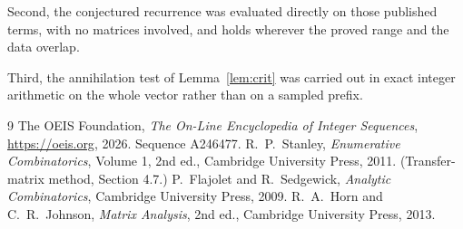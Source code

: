 \documentclass[11pt,a4paper]{article}
\theoremstyle{plain}
\theoremstyle{definition}
\begin{document}
Second, the conjectured recurrence was evaluated directly on those published terms, with no
matrices involved, and holds wherever the proved range and the data overlap.

Third, the annihilation test of Lemma~\ref{lem:crit} was carried out in exact integer
arithmetic on the whole vector rather than on a sampled prefix.

\begin{thebibliography}{9}
 The OEIS Foundation, \emph{The On-Line Encyclopedia of Integer
Sequences}, \url{https://oeis.org}, 2026. Sequence A246477.
 R.~P.~Stanley, \emph{Enumerative Combinatorics}, Volume 1, 2nd ed.,
Cambridge University Press, 2011. (Transfer-matrix method, Section 4.7.)
 P.~Flajolet and R.~Sedgewick, \emph{Analytic Combinatorics}, Cambridge
University Press, 2009.
 R.~A.~Horn and C.~R.~Johnson, \emph{Matrix Analysis}, 2nd ed., Cambridge
University Press, 2013.
\end{thebibliography}
\end{document}
